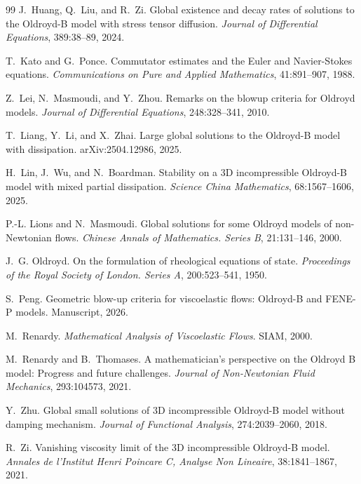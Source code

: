 \documentclass[11pt]{article}
\numberwithin{equation}{section}
\begin{document}
\begin{thebibliography}{99}
J.~Huang, Q.~Liu, and R.~Zi.
\newblock Global existence and decay rates of solutions to the Oldroyd-B model
with stress tensor diffusion.
\newblock \emph{Journal of Differential Equations}, 389:38--89, 2024.

T.~Kato and G.~Ponce.
\newblock Commutator estimates and the Euler and Navier-Stokes equations.
\newblock \emph{Communications on Pure and Applied Mathematics},
41:891--907, 1988.

Z.~Lei, N.~Masmoudi, and Y.~Zhou.
\newblock Remarks on the blowup criteria for Oldroyd models.
\newblock \emph{Journal of Differential Equations}, 248:328--341, 2010.

T.~Liang, Y.~Li, and X.~Zhai.
\newblock Large global solutions to the Oldroyd-B model with dissipation.
\newblock arXiv:2504.12986, 2025.

H.~Lin, J.~Wu, and N.~Boardman.
\newblock Stability on a 3D incompressible Oldroyd-B model with mixed partial
dissipation.
\newblock \emph{Science China Mathematics}, 68:1567--1606, 2025.

P.-L. Lions and N.~Masmoudi.
\newblock Global solutions for some Oldroyd models of non-Newtonian flows.
\newblock \emph{Chinese Annals of Mathematics. Series B}, 21:131--146, 2000.

J.~G. Oldroyd.
\newblock On the formulation of rheological equations of state.
\newblock \emph{Proceedings of the Royal Society of London. Series A},
200:523--541, 1950.

S.~Peng.
\newblock Geometric blow-up criteria for viscoelastic flows: Oldroyd-B and
FENE-P models.
\newblock Manuscript, 2026.

M.~Renardy.
\newblock \emph{Mathematical Analysis of Viscoelastic Flows}.
\newblock SIAM, 2000.

M.~Renardy and B.~Thomases.
\newblock A mathematician's perspective on the Oldroyd B model: Progress and
future challenges.
\newblock \emph{Journal of Non-Newtonian Fluid Mechanics}, 293:104573, 2021.

Y.~Zhu.
\newblock Global small solutions of 3D incompressible Oldroyd-B model without
damping mechanism.
\newblock \emph{Journal of Functional Analysis}, 274:2039--2060, 2018.

R.~Zi.
\newblock Vanishing viscosity limit of the 3D incompressible Oldroyd-B model.
\newblock \emph{Annales de l'Institut Henri Poincare C, Analyse Non Lineaire},
38:1841--1867, 2021.

\end{thebibliography}
\end{document}
